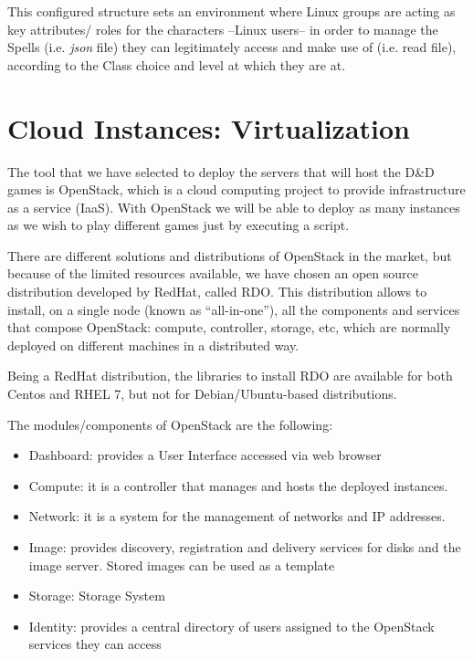 \documentclass[a4paper,12pt]{report}
\begin{document}

This configured structure sets an environment where Linux groups are acting as key attributes/ roles for the characters --Linux users-- in order to manage the Spells (i.e. \textit{json} file) they can legitimately access and make use of (i.e. read file), according to the Class choice and level at which they are at.


\section{Cloud Instances: Virtualization}
\label{sec:planCloud}

The tool that we have selected to deploy the servers that will host the D\&D games is OpenStack, which is a cloud computing project to provide infrastructure as a service (IaaS). With OpenStack we will be able to deploy as many instances as we wish to play different games just by executing a script.

There are different solutions and distributions of OpenStack in the market, but because of the limited resources available, we have chosen an open source distribution developed by RedHat, called RDO. This distribution allows to install, on a single node (known as \enquote{all-in-one}), all the components and services that compose OpenStack: compute, controller, storage, etc, which are normally deployed on different machines in a distributed way.

Being a RedHat distribution, the libraries to install RDO are available for both Centos and RHEL 7, but not for Debian/Ubuntu-based distributions. 

The modules/components of OpenStack are the following:
\begin{itemize}
\item Dashboard: provides a User Interface accessed via web browser 
\item Compute: it is a controller that manages and hosts the deployed instances. 
\item Network: it is a system for the management of networks and IP addresses.
\item Image: provides discovery, registration and delivery services for disks and the image server. Stored images can be used as a template
\item Storage: Storage System
\item Identity: provides a central directory of users assigned to the OpenStack services they can access
\end{itemize}
\end{document}
